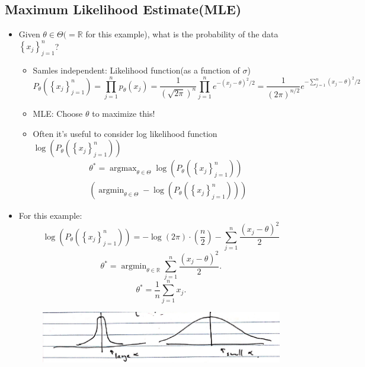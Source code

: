 \subsection{Maximum Likelihood Estimate(MLE)}
\begin{itemize}
	\item Given $\theta \in \Theta (=\mathbb{R}$ for this example), what is the probability of the data $\left\{x_{j}\right\}_{j=1}^{n}$?
	\begin{itemize}
		\item Samles independent: Likelihood function(as a function of $\sigma$) 
		$$
		P_{\theta}\left(\left\{x_{j}\right\}_{j=1}^{n}\right)=\prod_{j=1}^{n} p_{\theta}\left(x_{j}\right)
		=\frac{1}{(\sqrt{2 \pi})^{n}}\prod_{j=1}^{n} e^{-\left(x_{j}-\theta\right)^{2} / 2}
		=\frac{1}{(2 \pi)^{n/ 2}} e^{-\sum_{j=1}^{n}\left(x_{j}-\theta\right)^{2} / 2}
		$$
		\item MLE: Choose $\theta$ to maximize this!
		\item Often it's useful to consider log likelihood function $\log \left(P_{\theta}\left(\left\{x_{j}\right\}_{j=1}^{n}\right)\right) $  
		$$
		\begin{aligned} \theta^{*}= \operatorname{argmax} _{\theta \in \Theta}\log \left(P_{\theta}\left(\left\{x_{j}\right\}_{j=1}^{n}\right)\right) \\
		\left(\operatorname{argmin} _{\theta \in \Theta}-\log \left(P_{\theta}\left(\left\{x_{j}\right\}_{j=1}^{n}\right)\right)\right) \end{aligned}
		$$
	\end{itemize}
     \item For this example: 
     $$
     \log \left(P_{\theta}\left(\left\{x_{j}\right\}_{j=1}^{n}\right)\right)=-\log (2 \pi) \cdot\left(\frac{n}{2}\right)-\sum_{j=1}^{n} \frac{\left(x_{j}-\theta\right)^{2}}{2}
     $$ 
     $$
     \theta^{*}=\operatorname{argmin}_{\theta \in \mathbb{R}} \sum_{j=1}^{n} \frac{\left(x_{j}-\theta\right)^{2}}{2}.
     $$
     $$
      \theta^{*}=\frac{1}{n} \sum_{j=1}^{n} x_{j}.
      $$
     
     	   \begin{figure}[ht!]
       	\centering
       	\includegraphics[width=.55\textwidth]{../figures/probabilityLR3.png}  
       \end{figure}
\end{itemize}

